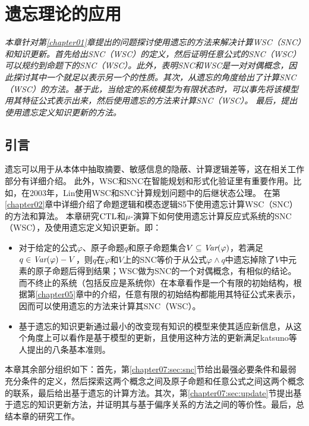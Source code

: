\chapter{遗忘理论的应用}
\label{chapter07}
{\em 本章针对第\ref{chapter01}章提出的问题探讨使用遗忘的方法来解决计算WSC（SNC）和知识更新。首先给出SNC（WSC）的定义，然后证明任意公式的SNC（WSC）可以规约到命题下的SNC（WSC）。此外，表明SNC和WSC是一对对偶概念，因此探讨其中一个就足以表示另一个的性质。其次，从遗忘的角度给出了计算SNC（WSC）的方法。基于此，当给定的系统模型为有限状态时，可以事先将该模型用其特征公式表示出来，然后使用遗忘的方法来计算SNC（WSC）。
最后，提出使用遗忘定义知识更新的方法。
	}
\section{引言}
遗忘可以用于从本体中抽取摘要、敏感信息的隐蔽、计算逻辑差等，这在相关工作部分有详细介绍。
此外，WSC和SNC在智能规划和形式化验证里有重要作用。比如，在2003年，Lin使用WSC和SNC计算规划问题中的后继状态公理。
在第\ref{chapter02}章中详细介绍了命题逻辑和模态逻辑S5下使用遗忘计算WSC（SNC）的方法和算法。
本章研究$\textrm{CTL}$和$\mu$-演算下如何使用遗忘计算反应式系统的SNC（WSC），及使用遗忘定义知识更新。即：
\begin{itemize}
	\item 对于给定的公式$\varphi$、原子命题$q$和原子命题集合$V\subseteq \textit{Var}(\varphi)$，若满足$q \in \textit{Var}(\varphi)-V$，则$q$在$\varphi$和$V$上的SNC等价于从公式$\varphi \wedge q$中遗忘掉除了$V$中元素的原子命题后得到结果；WSC做为SNC的一个对偶概念，有相似的结论。而不终止的系统（包括反应是系统你）在本章看作是一个有限的初始结构，根据第\ref{chapter05}章中的介绍，任意有限的初始结构都能用其特征公式来表示，因而可以使用遗忘的方法来计算其SNC（WSC）。
	\item 基于遗忘的知识更新通过最小的改变现有知识的模型来使其适应新信息，从这个角度上可以看作是基于模型的更新，且使用这种方法的更新满足katsuno等人提出的八条基本准则\cite{katsuno91mendelzon}。
\end{itemize}


本章其余部分组织如下：首先，第\ref{chapter07:sec:snc}节给出最强必要条件和最弱充分条件的定义，然后探索这两个概念之间及原子命题和任意公式之间这两个概念的联系，最后给出基于遗忘的计算方法。其次，第\ref{chapter07:sec:update}节提出基于遗忘的知识更新方法，并证明其与基于偏序关系的方法之间的等价性。最后，总结本章的研究工作。

